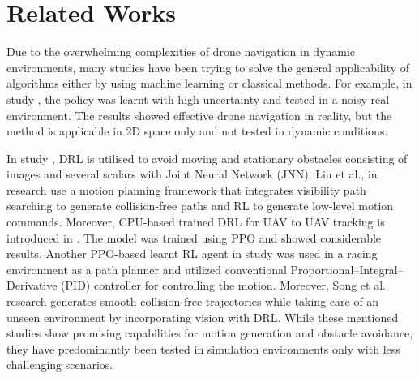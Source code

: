 \section{Related Works}
Due to the overwhelming complexities of drone navigation in dynamic environments, many studies have been trying to solve the general applicability of algorithms either by using machine learning or classical methods. For example, in study \cite{Sim2real10553074}, the policy was learnt with high uncertainty and tested in a noisy real environment. The results showed effective drone navigation in reality, but the method is applicable in 2D space only and not tested in dynamic conditions. 

In study \cite{NavigateObstacleDRL9081749}, DRL is utilised to avoid moving and stationary obstacles consisting of images and several scalars with Joint Neural Network (JNN). Liu et al., in research \cite{searchtocontrolreinforcementlearningbased} use a motion planning framework that integrates visibility path searching to generate collision-free paths and RL to generate low-level motion commands. Moreover, CPU-based trained DRL for UAV to UAV tracking is introduced in \cite{PPOtrackingTAN2023101497}. The model was trained using PPO and showed considerable results. Another PPO-based learnt RL agent in study \cite{LongtermDRL9259811} was used in a racing environment as a path planner and utilized conventional Proportional–Integral–Derivative (PID) controller for controlling the motion. Moreover, Song et al. research \cite{SmoothTrajectoryCollision10069287} generates smooth collision-free trajectories while taking care of an unseen environment by incorporating vision with DRL. While these mentioned studies show promising capabilities for motion generation and obstacle avoidance, they have predominantly been tested in simulation environments only with less challenging scenarios.

